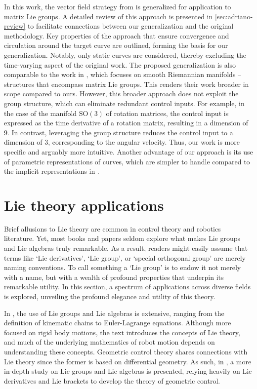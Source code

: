 In this work, the vector field strategy from \citet{Rezende2022} is generalized for application to matrix Lie groups. A detailed review of this approach is presented in \cref{sec:adriano-review} to facilitate connections between our generalization and the original methodology. Key properties of the approach that ensure convergence and circulation around the target curve are outlined, forming the basis for our generalization. Notably, only static curves are considered, thereby excluding the time-varying aspect of the original work. The proposed generalization is also comparable to the work in \citet{yao2022topological}, which focuses on smooth Riemannian manifolds -- structures that encompass matrix Lie groups. This renders their work broader in scope compared to ours. However, this broader approach does not exploit the group structure, which can eliminate redundant control inputs. For example, in the case of the manifold $\text{SO}(3)$ of rotation matrices, the control input is expressed as the time derivative of a rotation matrix, resulting in a dimension of $9$. In contrast, leveraging the group structure reduces the control input to a dimension of $3$, corresponding to the angular velocity. Thus, our work is more specific and arguably more intuitive. Another advantage of our approach is its use of parametric representations of curves, which are simpler to handle compared to the implicit representations in \citet{yao2022topological}.

\section{Lie theory applications} \label{sec:lit-review-lie-theory}
Brief allusions to Lie theory are common in control theory and robotics literature. Yet, most books and papers seldom explore what makes Lie groups and Lie algebras truly remarkable. As a result, readers might easily assume that terms like `Lie derivatives', `Lie group', or `special orthogonal group' are merely naming conventions. To call something a `Lie group' is to endow it not merely with a name, but with a wealth of profound properties that underpin its remarkable utility. In this section, a spectrum of applications across diverse fields is explored, unveiling the profound elegance and utility of this theory.

In \citet{Murray1994}, the use of Lie groups and Lie algebras is extensive, ranging from the definition of kinematic chains to Euler-Lagrange equations. Although more focused on rigid body motions, the text introduces the concepts of Lie theory, and much of the underlying mathematics of robot motion depends on understanding these concepts. Geometric control theory shares connections with Lie theory since the former is based on differential geometry. As such, in \citet{Bullo2004}, a more in-depth study on Lie groups and Lie algebras is presented, relying heavily on Lie derivatives and Lie brackets to develop the theory of geometric control.


